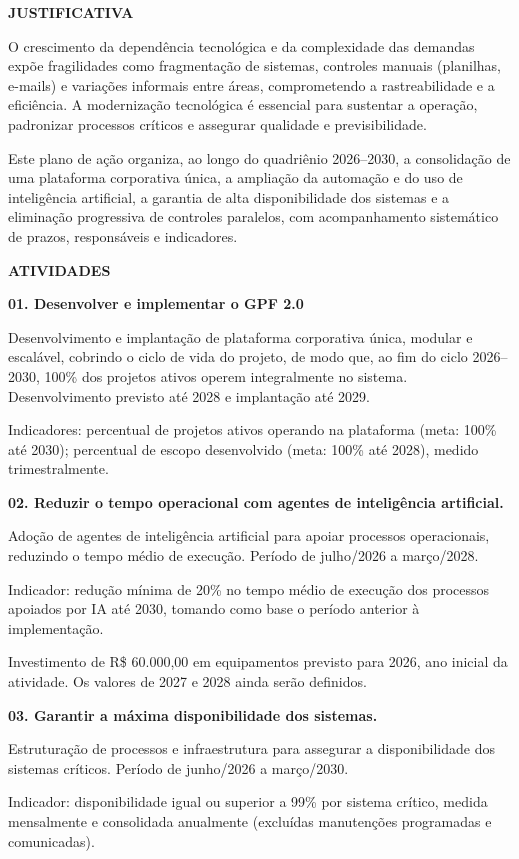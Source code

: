 \documentclass[12pt,a4paper]{article}
\newcommand{\secao}[1]{%
  \par\vspace{6pt}%
  {\noindent\bfseries\color{azulTitulo}\fontsize{13}{16}\selectfont #1}%
  \par\vspace{2pt}%
}
\newcommand{\atividade}[1]{%
  \par{\bfseries\color{azulAtividade}#1}\par
}
\begin{document}
\secao{JUSTIFICATIVA}

O crescimento da dependência tecnológica e da complexidade das demandas expõe fragilidades como fragmentação de sistemas, controles manuais (planilhas, e-mails) e variações informais entre áreas, comprometendo a rastreabilidade e a eficiência. A modernização tecnológica é essencial para sustentar a operação, padronizar processos críticos e assegurar qualidade e previsibilidade.

Este plano de ação organiza, ao longo do quadriênio 2026--2030, a consolidação de uma plataforma corporativa única, a ampliação da automação e do uso de inteligência artificial, a garantia de alta disponibilidade dos sistemas e a eliminação progressiva de controles paralelos, com acompanhamento sistemático de prazos, responsáveis e indicadores.

\secao{ATIVIDADES}

\atividade{01. Desenvolver e implementar o GPF 2.0}

Desenvolvimento e implantação de plataforma corporativa única, modular e escalável, cobrindo o ciclo de vida do projeto, de modo que, ao fim do ciclo 2026--2030, 100\% dos projetos ativos operem integralmente no sistema. Desenvolvimento previsto até 2028 e implantação até 2029.

Indicadores: percentual de projetos ativos operando na plataforma (meta: 100\% até 2030); percentual de escopo desenvolvido (meta: 100\% até 2028), medido trimestralmente.

\atividade{02. Reduzir o tempo operacional com agentes de inteligência artificial.}

Adoção de agentes de inteligência artificial para apoiar processos operacionais, reduzindo o tempo médio de execução. Período de julho/2026 a março/2028.

Indicador: redução mínima de 20\% no tempo médio de execução dos processos apoiados por IA até 2030, tomando como base o período anterior à implementação.

Investimento de R\$ 60.000,00 em equipamentos previsto para 2026, ano inicial da atividade. Os valores de 2027 e 2028 ainda serão definidos.

\atividade{03. Garantir a máxima disponibilidade dos sistemas.}

Estruturação de processos e infraestrutura para assegurar a disponibilidade dos sistemas críticos. Período de junho/2026 a março/2030.

Indicador: disponibilidade igual ou superior a 99\% por sistema crítico, medida mensalmente e consolidada anualmente (excluídas manutenções programadas e comunicadas).
\end{document}
